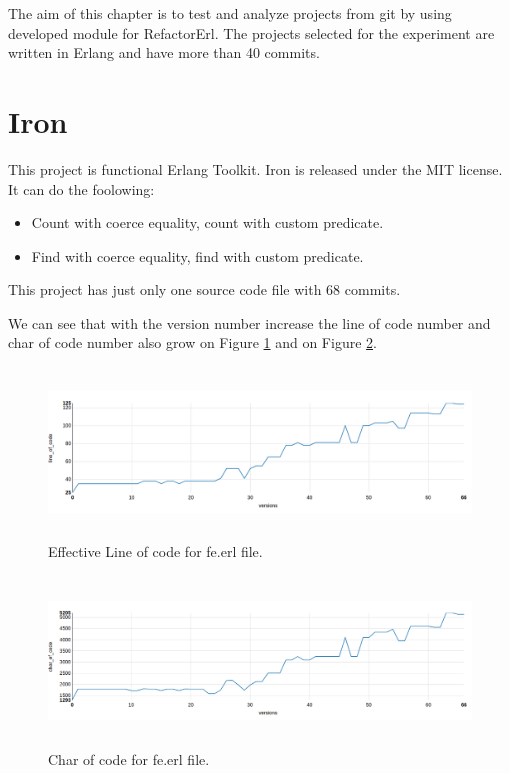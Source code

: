 The aim of this chapter is to test and analyze projects from git by using developed module for RefactorErl. The projects selected for the experiment are written in Erlang and have more than 40 commits.

\section{Iron}

This project is functional Erlang Toolkit. Iron is released under the MIT license. It can do the foolowing:
\begin{itemize}
	\item Count with coerce equality, count with custom predicate.
	\item Find with coerce equality, find with custom predicate.
\end{itemize}

This project has just only one source code file with 68 commits.

We can see that with the version number increase the line of code number and char of code number also grow on Figure \ref{fig:loc_iron} and on Figure \ref{fig:char_iron}.

\begin{figure}[h]
	\centering
	\includegraphics[height=45mm]{figures/loc_iron.png}
	\caption{Effective Line of code for fe.erl file.}
	\label{fig:loc_iron}
\end{figure}

\begin{figure}[h]
	\centering
	\includegraphics[height=45mm]{figures/char_iron.png}
	\caption{Char of code for fe.erl file.}
	\label{fig:char_iron}
\end{figure}

